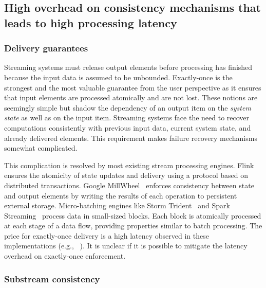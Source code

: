 \subsection{High overhead on consistency mechanisms that leads to high processing latency}

\subsubsection{Delivery guarantees}


Streaming systems must release output elements before processing has finished because the input data is assumed to be unbounded. Exactly-once is the strongest and the most valuable guarantee from the user perspective as it ensures that input elements are processed atomically and are not lost. These notions are seemingly simple but shadow the dependency of an output item on the {\em system state} as well as on the input item. 
Streaming systems face the need to recover computations consistently with previous input data, current system state, and already delivered elements.
This requirement makes failure recovery mechanisms somewhat complicated. 

This complication is resolved by most existing stream processing engines. 
Flink ensures the atomicity of state updates and delivery using a protocol based on distributed transactions. 
Google MillWheel~\cite{Akidau:2013:MFS:2536222.2536229} enforces consistency between state and output elements by writing the results of each operation to persistent external storage. 
Micro-batching engines like Storm Trident~\cite{apache:storm:trident} and Spark Streaming~\cite{Zaharia:2012:DSE:2342763.2342773} process data in small-sized blocks. 
Each block is atomically processed at each stage of a data flow, providing properties similar to batch processing. 
The price for exactly-once delivery is a high latency observed in these implementations (e.g., ~\cite{7530084, 7474816}). It is unclear if it is possible to mitigate the latency overhead on exactly-once enforcement.

\subsubsection{Substream consistency}

